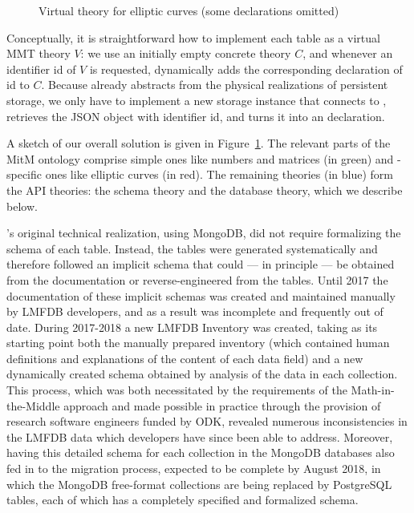 \begin{figure}[ht]
{
    }
    \endgroup
  \caption[Virtual Theory Architecture]{
    Virtual theory for \lmfdb elliptic curves (some declarations omitted) 
  }
  \label{fig:vtarch}
\end{figure}
Conceptually, it is straightforward how to implement each \lmfdb table as a virtual MMT theory $V$: we use an initially empty concrete theory $C$, and whenever an identifier \textsf{id} of $V$ is requested, \mmt dynamically adds the corresponding declaration of \textsf{id} to $C$.
Because \mmt already abstracts from the physical realizations of persistent storage, we only have to implement a new storage instance that connects to \lmfdb, retrieves the JSON object with identifier \textsf{id}, and turns it into an \ommt declaration.

A sketch of our overall solution is given in Figure~\ref{fig:vtarch}.
The relevant parts of the MitM ontology comprise simple ones like numbers and matrices (in green) and \lmfdb-specific ones like elliptic curves (in red).
The remaining theories (in blue) form the \lmfdb API theories: the schema theory and the database theory, which we describe below.

\lmfdb's original technical realization, using MongoDB, did not require formalizing the schema of each table.
Instead, the tables were generated systematically and therefore followed an implicit schema that could --- in principle --- be obtained from the documentation or reverse-engineered from the tables.
Until 2017 the documentation of these implicit schemas was created and maintained manually by LMFDB developers, and as a result was incomplete and frequently out of date.
During 2017-2018 a new LMFDB Inventory was created, taking as its starting point both the manually prepared inventory (which contained human definitions and explanations of the content of each data field) and a new dynamically created schema obtained by analysis of the data in each collection.
This process, which was both necessitated by the requirements of the Math-in-the-Middle approach and made possible in practice through the provision of research software engineers funded by ODK, revealed numerous inconsistencies in the LMFDB data which developers have since been able to address.
Moreover, having this detailed schema for each collection in the MongoDB databases also fed in to the migration process, expected to be complete by August 2018, in which the MongoDB free-format collections are being replaced by PostgreSQL tables, each of which has a completely specified and formalized schema.

